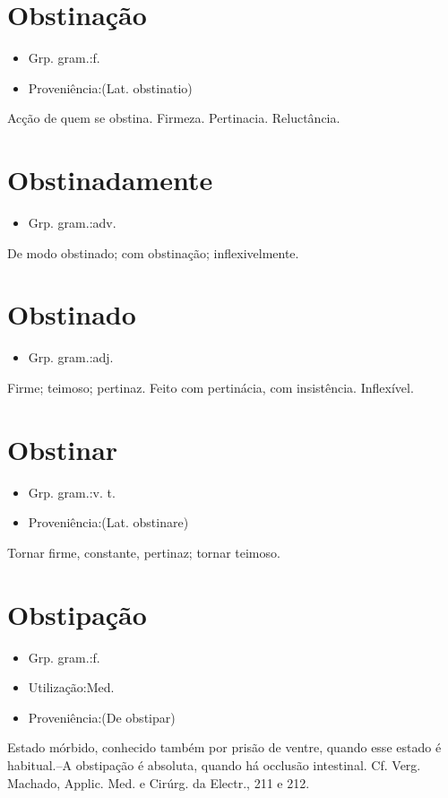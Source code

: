 \section{Obstinação}
\begin{itemize}
\item {Grp. gram.:f.}
\end{itemize}
\begin{itemize}
\item {Proveniência:(Lat. \textunderscore obstinatio\textunderscore )}
\end{itemize}
Acção de quem se obstina.
Firmeza.
Pertinacia.
Reluctância.
\section{Obstinadamente}
\begin{itemize}
\item {Grp. gram.:adv.}
\end{itemize}
De modo obstinado; com obstinação; inflexivelmente.
\section{Obstinado}
\begin{itemize}
\item {Grp. gram.:adj.}
\end{itemize}
Firme; teimoso; pertinaz.
Feito com pertinácia, com insistência.
Inflexível.
\section{Obstinar}
\begin{itemize}
\item {Grp. gram.:v. t.}
\end{itemize}
\begin{itemize}
\item {Proveniência:(Lat. \textunderscore obstinare\textunderscore )}
\end{itemize}
Tornar firme, constante, pertinaz; tornar teimoso.
\section{Obstipação}
\begin{itemize}
\item {Grp. gram.:f.}
\end{itemize}
\begin{itemize}
\item {Utilização:Med.}
\end{itemize}
\begin{itemize}
\item {Proveniência:(De \textunderscore obstipar\textunderscore )}
\end{itemize}
Estado mórbido, conhecido também por prisão de ventre, quando esse estado é habitual.--A obstipação é absoluta, quando há occlusão intestinal. Cf. Verg. Machado, \textunderscore Applic. Med. e Cirúrg. da Electr.\textunderscore , 211 e 212.
